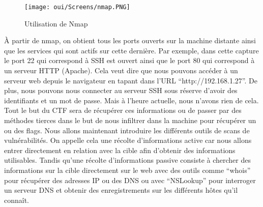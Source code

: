 \begin{figure}[htp!]
  \centering
  \setlength\figureheight{7cm}
  \setlength\figurewidth{9cm}
  \texttt{[image: oui/Screens/nmap.PNG]}
  \caption{Utilisation de Nmap}
  \label{fig:courbe-tikz}
\end{figure}
À partir de nmap, on obtient tous les ports ouverts sur la machine distante ainsi que les services qui sont actifs sur cette dernière. Par exemple, dans cette capture le port 22 qui correspond à SSH est ouvert ainsi que le port 80 qui correspond à un serveur HTTP (Apache). Cela veut dire que nous pouvons accéder à un serveur web depuis le navigateur en tapant dans l’URL “http://192.168.1.27”. De plus, nous pouvons nous connecter au serveur SSH sous réserve d’avoir des identifiants et un mot de passe. Mais à l’heure actuelle, nous n’avons rien de cela. Tout le but du CTF sera de récupérer ces informations ou de passer par des méthodes tierces dans le but de nous infiltrer dans la machine pour récupérer un ou des flags. Nous allons maintenant introduire les différents outils de scans de vulnérabilités. On appelle cela une récolte d’informations active car nous allons entrer directement en relation avec la cible afin d’obtenir des informations utilisables. Tandis qu’une récolte d’informations passive consiste à chercher des informations sur la cible directement sur le web avec des outils comme “whois” pour récupérer des adresses IP ou des DNS ou avec “NSLookup” pour interroger un serveur DNS et obtenir des enregistrements sur les différents hôtes qu’il connaît.